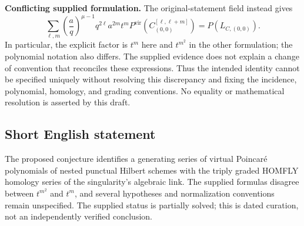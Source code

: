 \documentclass[11pt]{article}
\begin{document}
\textbf{Conflicting supplied formulation.} The original-statement field instead gives
\[
\sum_{\ell,m}\left(\frac aq\right)^{\mu-1}
q^{2\ell}a^{2m}t^m
P^{\mathrm{vir}}\!\left(C_{(0,0)}^{[\ell,\ell+m]}\right)
=P(L_{C,(0,0)}).
\]
In particular, the explicit factor is \(t^m\) here and \(t^{m^2}\) in the other formulation; the polynomial notation also differs. The supplied evidence does not explain a change of convention that reconciles these expressions. Thus the intended identity cannot be specified uniquely without resolving this discrepancy and fixing the incidence, polynomial, homology, and grading conventions. No equality or mathematical resolution is asserted by this draft.
\subsection{Short English statement}
The proposed conjecture identifies a generating series of virtual Poincar\'e polynomials of nested punctual Hilbert schemes with the triply graded HOMFLY homology series of the singularity's algebraic link. The supplied formulas disagree between \(t^{m^2}\) and \(t^m\), and several hypotheses and normalization conventions remain unspecified. The supplied status is partially solved; this is dated curation, not an independently verified conclusion.
\end{document}
